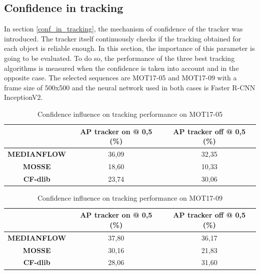 \subsection{Confidence in tracking}
In section \ref{conf_in_tracking}, the mechanism of confidence of the tracker was introduced. The tracker itself continuously checks if the tracking obtained for each object is reliable enough. In this section, the importance of this parameter is going to be evaluated. To do so, the performance of the three best tracking algorithms is measured when the confidence is taken into account and in the opposite case. The selected sequences are MOT17-05 and MOT17-09 with a frame size of 500x500 and the neural network used in both cases is Faster R-CNN InceptionV2.\\
\begin{table}[H]
\scriptsize
\begin{center}
\begin{tabular}{|c|c|c|}
\hline
\textbf{}           & \textbf{AP tracker on @ 0,5 (\%)} & \textbf{AP tracker off @ 0,5 (\%)} \\ \hline
\textbf{MEDIANFLOW} & 36,09                             & 32,35                              \\ \hline
\textbf{MOSSE}      & 18,60                             & 10,33                              \\ \hline
\textbf{CF-dlib}    & 23,74                             & 30,06                              \\ \hline
\end{tabular}
\end{center}
\caption{Confidence influence on tracking performance on MOT17-05}
\label{tab:tracker_exp_4}
\end{table}
\begin{table}[H]
\scriptsize
\begin{center}
\begin{tabular}{|c|c|c|}
\hline
\textbf{}           & \textbf{AP tracker on @ 0,5 (\%)} & \textbf{AP tracker off @ 0,5 (\%)} \\ \hline
\textbf{MEDIANFLOW} & 37,80                             & 36,17                              \\ \hline
\textbf{MOSSE}      & 30,16                             & 21,83                              \\ \hline
\textbf{CF-dlib}    & 28,06                             & 31,60                              \\ \hline
\end{tabular}
\end{center}
\caption{Confidence influence on tracking performance on MOT17-09}
\label{tab:tracker_exp_5}
\end{table}
